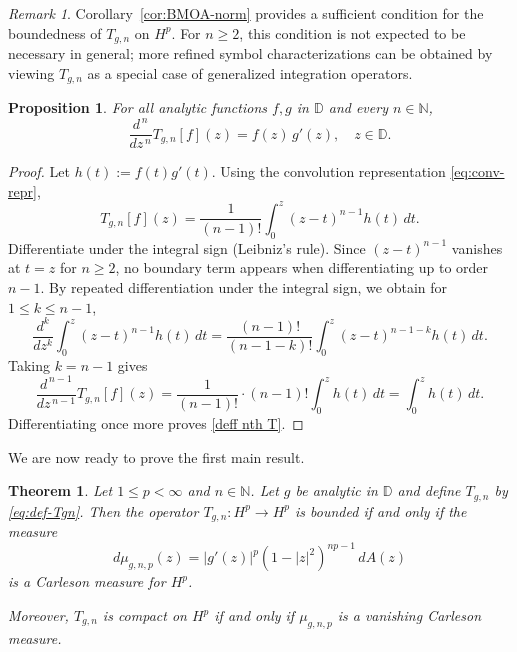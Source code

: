 \documentclass[preprint,12pt]{elsarticle}
\numberwithin{equation}{section}
\newtheorem{theorem}{Theorem}[section]
\newtheorem{proposition}{Proposition}[section]
\theoremstyle{remark}
\newtheorem{remark}{Remark}[section]
\begin{document}
\begin{remark}\label{rem:sufficient-only}
Corollary~\ref{cor:BMOA-norm} provides a sufficient condition for the boundedness
of $T_{g,n}$ on $H^p$. For $n\ge 2$, this condition is not expected to be necessary in general; more refined symbol characterizations can be obtained by viewing $T_{g,n}$ as a special case of generalized integration operators.
\end{remark}

\begin{proposition}\label{prop:diff-id}
For all analytic functions $f,g$ in $\mathbb{D}$ and every $n\in\mathbb{N}$,
\begin{equation}\label{deff nth T}
\frac{d^{\,n}}{dz^{\,n}} T_{g,n}[f](z) = f(z)\, g'(z),\quad z\in\mathbb{D}.
\end{equation}
\end{proposition}

\begin{proof}
Let $h(t):=f(t)g'(t)$. Using the convolution representation \eqref{eq:conv-repr},
\begin{equation*}
T_{g,n}[f](z)=\frac{1}{(n-1)!}\int_0^z (z-t)^{n-1}h(t)\,dt.
\end{equation*}
Differentiate under the integral sign (Leibniz's rule). Since $(z-t)^{n-1}$ vanishes at $t=z$ for $n\ge2$, no boundary term appears when differentiating up to order $n-1$. By repeated differentiation under the integral sign, we obtain for $1\le k\le n-1$,
\begin{equation*}
\frac{d^k}{dz^k}\int_0^z (z-t)^{n-1}h(t)\,dt
= \frac{(n-1)!}{(n-1-k)!}\int_0^z (z-t)^{n-1-k}h(t)\,dt.
\end{equation*}
Taking $k=n-1$ gives
\begin{equation*}
\frac{d^{\,n-1}}{dz^{\,n-1}}T_{g,n}[f](z)
= \frac{1}{(n-1)!}\cdot (n-1)!\int_0^z h(t)\,dt
= \int_0^z h(t)\,dt.
\end{equation*}
Differentiating once more proves \eqref{deff nth T}.
\end{proof}


We are now ready to prove the first main result.

\begin{theorem}\label{thm:Hp-Tgn-Carleson}
Let $1\le p<\infty$ and $n\in\mathbb N$. Let $g$ be analytic in $\mathbb{D}$ and define $T_{g,n}$ by \eqref{eq:def-Tgn}. Then the operator $T_{g,n}:H^p\to H^p$ is bounded if and only if the measure
\begin{equation}\label{dmu bnp}
d\mu_{g,n,p}(z)=|g'(z)|^p(1-|z|^2)^{np-1}\,dA(z)
\end{equation}
is a Carleson measure for $H^p$.

Moreover, $T_{g,n}$ is compact on $H^p$ if and only if $\mu_{g,n,p}$ is a vanishing Carleson measure.
\end{theorem}
\end{document}
